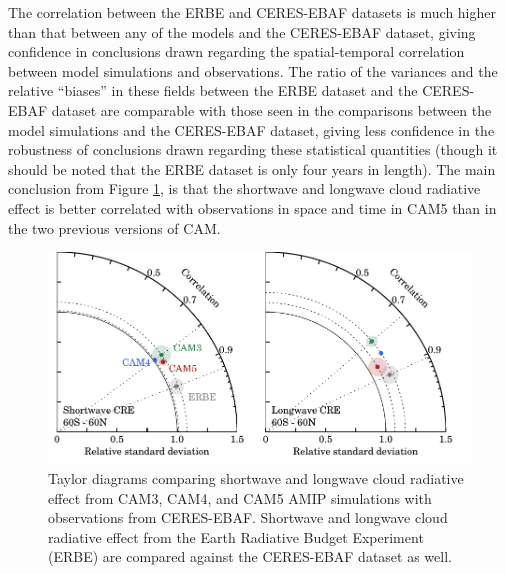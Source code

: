 The correlation between the ERBE and CERES-EBAF datasets is much higher than that between any of the models and the CERES-EBAF dataset, giving confidence in conclusions drawn regarding the spatial-temporal correlation between model simulations and observations. The ratio of the variances and the relative ``biases'' in these fields between the ERBE dataset and the CERES-EBAF dataset are comparable with those seen in the comparisons between the model simulations and the CERES-EBAF dataset, giving less confidence in the robustness of conclusions drawn regarding these statistical quantities (though it should be noted that the ERBE dataset is only four years in length). The main conclusion from Figure \ref{cre_camamip_taylor}, is that the shortwave and longwave cloud radiative effect is better correlated with observations in space and time in CAM5 than in the two previous versions of CAM.
\begin{figure}
    \centering
    \includegraphics{../graphics/cre_camamip_taylor.pdf}
    \caption[Taylor diagrams comparing shortwave and longwave cloud radiative effect from CAM3, CAM4, and CAM5 AMIP simulations with observations from CERES-EBAF.]{Taylor diagrams comparing shortwave and longwave cloud radiative effect from CAM3, CAM4, and CAM5 AMIP simulations with observations from CERES-EBAF. Shortwave and longwave cloud radiative effect from the Earth Radiative Budget Experiment (ERBE) \citep{harrison_et_al_1990} are compared against the CERES-EBAF dataset as well.}
    \label{cre_camamip_taylor}
\end{figure}

